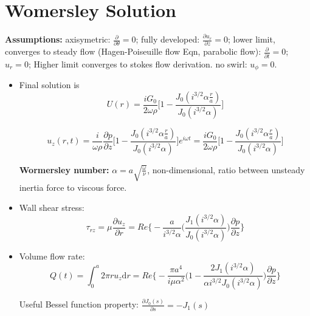 \documentclass{article}
\begin{document}
\section{Womersley Solution}
\textbf{Assumptions: }
axisymetric: $\displaystyle \frac{\partial}{\partial \theta}=0$; 
fully developed: $\displaystyle \frac{\partial u_{r}}{\partial z}=0$; 
lower limit, converges to steady flow (Hagen-Poiseuille flow Eqn, parabolic flow): $\displaystyle \frac{\partial}{\partial t}=0$; $u_{r}=0$; Higher limit converges to stokes flow derivation.  
no swirl: $u_{\phi}=0$.
\begin{itemize}
    \item Final solution is \[U(r) = \frac{iG_{0}}{2\omega \rho}\bigg[ 1- \frac{J_{0}(i^{3/2}\alpha 
    \frac{r}{a})}{J_{0}(i^{3/2}\alpha)} \bigg]\]
    
    \[u_{z}(r,t) = \frac{i}{\omega \rho} \frac{\partial p}{\partial z} \bigg[ 1- \frac{J_{0}(i^{3/2}\alpha 
    \frac{r}{a})}{J_{0}(i^{3/2}\alpha)} \bigg] e^{i\omega t} = \frac{iG_{0}}{2\omega \rho}\bigg[ 1- \frac{J_{0}(i^{3/2}\alpha 
    \frac{r}{a})}{J_{0}(i^{3/2}\alpha)} \bigg] \]
    
    \noindent \textbf{Wormersley number:} $\displaystyle \alpha = a \sqrt{\frac{\omega}{\nu}}$,  non-dimensional, ratio between unsteady inertia force to viscous force.
    
    \item Wall shear stress: \[\tau_{rz} = \mu \frac{\partial u_{z}}{\partial r} = Re\bigg\{ -\frac{a}{i^{3/2}\alpha} \bigg( \frac{J_{1}(i^{3/2}\alpha)}{J_{0}(i^{3/2}\alpha)} \bigg) \frac{\partial p}{\partial z} \bigg\}\]
    
    \item Volume flow rate: \[Q(t) = \int_{0}^{a} 2\pi r u_{z} \mathrm{d}r = Re\bigg\{ -\frac{\pi a^{4}}{i \mu \alpha^{2}} \bigg( 1 - \frac{2J_{1}(i^{3/2}\alpha)}{\alpha i^{3/2} J_{0}(i^{3/2}\alpha)} \bigg) \frac{\partial p}{\partial z} \bigg\}\]
    
    Useful Bessel function property: $\displaystyle \frac{\partial J_{0}(s)}{\partial s} = -J_{1}(s)$
\end{itemize}

\end{document}

